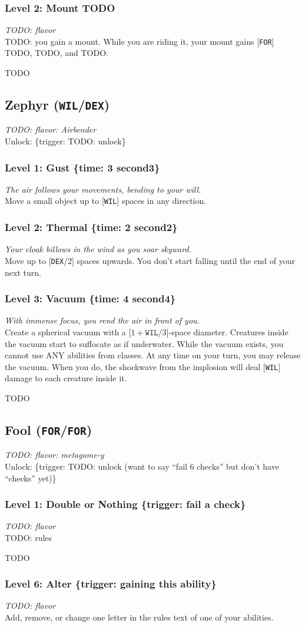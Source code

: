 \documentclass[12pt]{article}
\newcommand{\DEX}{\texttt{DEX}}
\newcommand{\WIL}{\texttt{WIL}}
\newcommand{\FOR}{\texttt{FOR}}
\newcommand{\TIME}[1]{\{time: #1 second\if1#1{}\else{s}\fi\}}
\newcommand{\TRIG}[1]{\{trigger: #1\}}
\newcommand{\Class}[4]{\pagebreak\subsection{#1 (#2)}\label{#1}\textit{#3}\\[1mm]Unlock: \TRIG{#4}}
\newcommand{\Skill}[5]{\subsubsection{Level #1: #2 #3}\textit{#4}\\[1mm]#5}
\begin{document}
\Skill{2}{Mount}{TODO}
{TODO: flavor}
{TODO: you gain a mount. While you are riding it, your mount gains [\FOR] TODO, TODO, and TODO.}

TODO

%

%

%

%

%

%

%

%

%

%

%

%

%

%

%

%

%

%

%

%

\Class{Zephyr}{\WIL/\DEX}
{TODO: flavor: Airbender}
{TODO: unlock}

\Skill{1}{Gust}{\TIME{3}}
{The air follows your movements, bending to your will.}
{Move a small object up to [\WIL] spaces in any direction.}

\Skill{2}{Thermal}{\TIME{2}}
{Your cloak billows in the wind as you soar skyward.}
{Move up to [\DEX/2] spaces upwards. You don't start falling until the end of your next turn.}

\Skill{3}{Vacuum}{\TIME{4}}
{With immense focus, you rend the air in front of you.}
{Create a spherical vacuum with a [$1 + \WIL / 3$]-space diameter. Creatures inside the vacuum start to suffocate as if underwater. While the vacuum exists, you cannot use ANY abilities from classes. At any time on your turn, you may release the vacuum. When you do, the shockwave from the implosion will deal [\WIL] damage to each creature inside it.}

TODO

%

%

%

%

%

%

%

%

%

%

\Class{Fool}{\FOR/\FOR}
{TODO: flavor: metagame-y}
{TODO: unlock (want to say ``fail 6 checks'' but don't have ``checks'' yet)}

\Skill{1}{Double or Nothing}{\TRIG{fail a check}}
{TODO: flavor}
{TODO: rules}

TODO

\Skill{6}{Alter}{\TRIG{gaining this ability}}
{TODO: flavor}
{Add, remove, or change one letter in the rules text of one of your abilities.}
\end{document}
